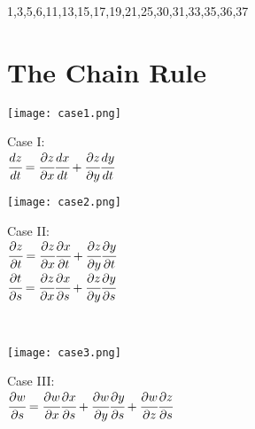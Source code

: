 \noindent{\color{smalt(darkpowderblue)}\rule{\linewidth}{.2mm}}
\begin{problem}
1,3,5,6,11,13,15,17,19,21,25,30,31,33,35,36,37
\end{problem}
\section{The Chain Rule}
\noindent\begin{minipage}{0.5\textwidth}
\begin{center}
   \texttt{[image: case1.png]}\\
\end{center}
\end{minipage}
\noindent\begin{minipage}{0.5\textwidth}
Case I:\\
$\cfrac{dz}{dt}=\cfrac{\partial  z}{\partial  x}\cfrac{dx}{dt}+\cfrac{\partial  z}{\partial  y}\cfrac{dy}{dt}$\\
\end{minipage}
\noindent\begin{minipage}{0.5\textwidth}
\begin{center}
   \texttt{[image: case2.png]}\\
\end{center}\end{minipage}
\noindent\begin{minipage}{0.3\textwidth}
Case II:\\
$\cfrac{\partial  z}{\partial  t}=\cfrac{\partial  z}{\partial  x}\cfrac{\partial  x}{\partial  t}+\cfrac{\partial  z}{\partial  y}\cfrac{\partial  y}{\partial  t}$\\
$\cfrac{\partial  t}{\partial s}=\cfrac{\partial z}{\partial x}\cfrac{\partial x}{\partial s}+\cfrac{\partial z}{\partial y}\cfrac{\partial y}{\partial s}$\\
\end{minipage}
\\
\noindent\begin{minipage}{0.5\textwidth}
\begin{center}
   \texttt{[image: case3.png]}\\
\end{center}\end{minipage}
\noindent\begin{minipage}{0.3\textwidth}
Case III:\\
$\cfrac{\partial w}{\partial s}=\cfrac{\partial w}{\partial x}\cfrac{\partial x}{\partial s}+\cfrac{\partial w}{\partial y}\cfrac{\partial y}{\partial s}+\cfrac{\partial w}{\partial z}\cfrac{\partial z}{\partial s}$\\
\end{minipage}\\

